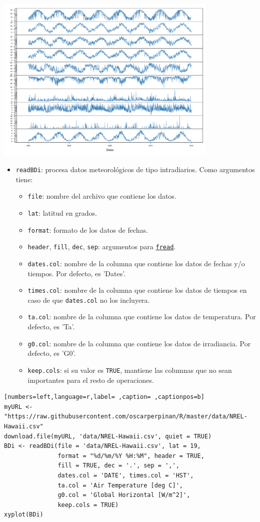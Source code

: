 \begin{itemize}
\begin{center}
\includegraphics[width=0.8\textwidth]{figuras/codigo-readBD.pdf}
\end{center}
\begin{itemize}
\item \texttt{readBDi}: procesa datos meteorológicos de tipo intradiarios.
Como argumentos tiene:
\begin{itemize}
\item \texttt{file}: nombre del archivo que contiene los datos.
\item \texttt{lat}: latitud en grados.
\item \texttt{format}: formato de los datos de fechas.
\item \texttt{header}, \texttt{fill}, \texttt{dec}, \texttt{sep}: argumentos para \href{https://search.r-project.org/CRAN/refmans/data.table/html/fread.html}{\texttt{fread}}.
\item \texttt{dates.col}: nombre de la columna que contiene los datos de fechas y/o tiempos. Por defecto, es 'Dates'.
\item \texttt{times.col}: nombre de la columna que contiene los datos de tiempos en caso de que \texttt{dates.col} no los incluyera.
\item \texttt{ta.col}: nombre de la columna que contiene los datos de temperatura. Por defecto, es 'Ta'.
\item \texttt{g0.col}: nombre de la columna que contiene los datos de irradiancia. Por defecto, es 'G0'.
\item \texttt{keep.cols}: si su valor es \texttt{TRUE}, mantiene las columnas que no sean importantes para el resto de operaciones.
\end{itemize}
\end{itemize}
\begin{lstlisting}[numbers=left,language=r,label= ,caption= ,captionpos=b]
myURL <- "https://raw.githubusercontent.com/oscarperpinan/R/master/data/NREL-Hawaii.csv"
download.file(myURL, 'data/NREL-Hawaii.csv', quiet = TRUE)
BDi <- readBDi(file = 'data/NREL-Hawaii.csv', lat = 19,
               format = "%d/%m/%Y %H:%M", header = TRUE,
               fill = TRUE, dec = '.', sep = ',',
               dates.col = 'DATE', times.col = 'HST',
               ta.col = 'Air Temperature [deg C]',
               g0.col = 'Global Horizontal [W/m^2]',
               keep.cols = TRUE)
xyplot(BDi)
\end{lstlisting}


\end{itemize}

